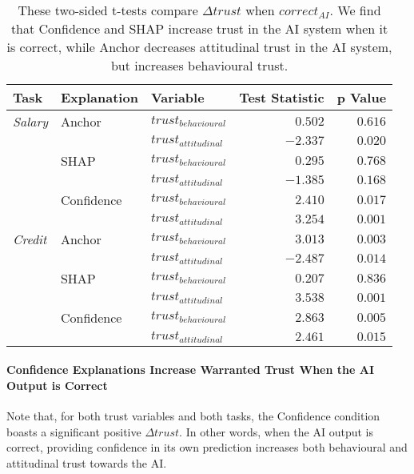 \begin{table}[htb]
    \centering
    \caption{These two-sided t-tests compare $\Delta trust$ when $correct_{AI}$. We find that Confidence and SHAP increase trust in the AI system when it is correct, while Anchor decreases attitudinal trust in the AI system, but increases behavioural trust.}
    \label{tab:delta-trust-t-positives}
    \begin{tabular}{lllrr}
        \toprule
        Task & Explanation & Variable & Test Statistic & p Value \\ 
        \midrule
        \emph{Salary} & Anchor & $trust_{behavioural}$ & $0.502$ & $0.616$ \\
        & & $trust_{attitudinal}$ & $\mathbf{-2.337}$ & $\mathbf{0.020}$ \\
        & SHAP & $trust_{behavioural}$ & $0.295$ & $0.768$ \\
        & & $trust_{attitudinal}$ & $-1.385$ & $0.168$ \\
        & Confidence & $trust_{behavioural}$ & $\mathbf{2.410}$ & $\mathbf{0.017}$ \\
        & & $trust_{attitudinal}$ & $\mathbf{3.254}$ & $\mathbf{0.001}$ \\
        \midrule
        \emph{Credit} & Anchor & $trust_{behavioural}$ & $\mathbf{3.013}$ & $\mathbf{0.003}$ \\
        & & $trust_{attitudinal}$ & $\mathbf{-2.487}$ & $\mathbf{0.014}$ \\
        & SHAP & $trust_{behavioural}$ & $0.207$ & $0.836$ \\
        & & $trust_{attitudinal}$ & $\mathbf{3.538}$ & $\mathbf{0.001}$ \\
        & Confidence & $trust_{behavioural}$ & $\mathbf{2.863}$ & $\mathbf{0.005}$ \\
        & & $trust_{attitudinal}$ & $\mathbf{2.461}$ & $\mathbf{0.015}$ \\
        \bottomrule
    \end{tabular}
\end{table}

\paragraph{Confidence Explanations Increase Warranted Trust When the AI Output is Correct}
Note that, for both trust variables and both tasks, the Confidence condition boasts a significant positive $\Delta trust$. In other words, when the AI output is correct, providing confidence in its own prediction increases both behavioural and attitudinal trust towards the AI.

